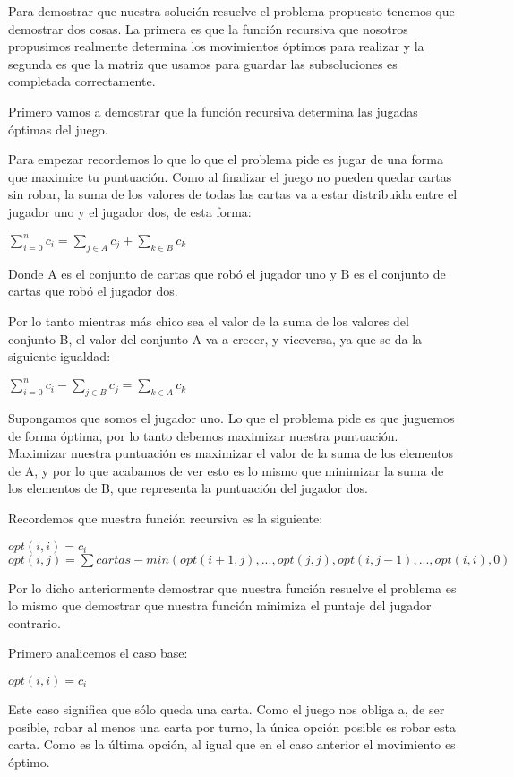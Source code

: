 Para demostrar que nuestra solución resuelve el problema propuesto tenemos que demostrar dos cosas. La primera es que la función recursiva que nosotros propusimos realmente determina los movimientos óptimos para realizar y la segunda es que la matriz que usamos para guardar las subsoluciones es completada correctamente.

Primero vamos a demostrar que la función recursiva determina las jugadas óptimas del juego. 

Para empezar recordemos lo que lo que el problema pide es jugar de una forma que maximice tu puntuación. Como al finalizar el juego no pueden quedar cartas sin robar, la suma de los valores de todas las cartas va a estar distribuida entre el jugador uno y el jugador dos, de esta forma:

$\sum_{i=0}^{n} c_i = \sum_{j \in A} c_j + \sum_{k \in B} c_k$

Donde A es el conjunto de cartas que robó el jugador uno y B es el conjunto de cartas que robó el jugador dos.

Por lo tanto mientras más chico sea el valor de la suma de los valores del conjunto B, el valor del conjunto A va a crecer, y viceversa, ya que se da la siguiente igualdad:

$\sum_{i=0}^{n} c_i  - \sum_{j \in B} c_j= \sum_{k \in A} c_k$

Supongamos que somos el jugador uno. Lo que el problema pide es que juguemos de forma óptima, por lo tanto debemos maximizar nuestra puntuación. Maximizar nuestra puntuación es maximizar el valor de la suma de los elementos de A, y  por lo que acabamos de ver esto es lo mismo que minimizar la suma de los elementos de B, que representa la puntuación del jugador dos.

Recordemos que nuestra función recursiva es la siguiente:

$opt(i,i) = c_i$ \\
$opt(i,j) = \sum cartas - min(opt(i+1, j), ..., opt(j,j), opt(i, j-1), ... ,opt(i,i), 0)$

Por lo dicho anteriormente demostrar que nuestra función resuelve el problema es lo mismo que demostrar que nuestra función minimiza el puntaje del jugador contrario.

Primero analicemos el caso base:

$opt(i,i) = c_i$

Este caso significa que sólo queda una carta. Como el juego nos obliga a, de ser posible, robar al menos una carta por turno, la única opción posible es robar esta carta. Como es la última opción, al igual que en el caso anterior el movimiento es óptimo.

